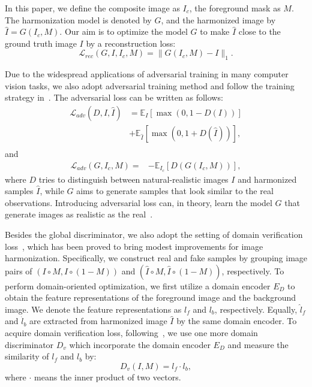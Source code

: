 \documentclass[final]{cvpr}
\begin{document}
In this paper, we define the composite image as $I_{c}$, the foreground mask as $M$. The harmonization model is denoted by $G$, and the harmonized image by $\hat{I} = G(I_{c}, M)$. Our aim is to optimize the model $G$ to make $\hat{I}$ close to the ground truth image $I$ by a reconstruction loss: 
\begin{equation}
\label{equ:rec}
\mathcal{L}_{rec}(G, I, I_{c}, M) = \|G(I_{c}, M) - I \|_{1}.
\end{equation}


Due to the widespread applications of adversarial training in many computer vision tasks, we also adopt adversarial training method and follow the training strategy in~\cite{cong2020dovenet,cun2020improving}. The adversarial loss can be written as follows:
\begin{equation}
\label{equ:adv_loss_d_hinge}
\begin{split}
\mathcal{L}_{adv}(D, I, \hat{I}) &= \mathbb{E}_{I}[\max(0, 1 - D(I))] \\
&+\mathbb{E}_{\hat{I}}[\max(0, 1+D(\hat{I}))], \\
\end{split}
\end{equation}
and
\begin{equation}
\label{equ:adv_loss_g_hinge}
\begin{split}
\mathcal{L}_{adv}(G, I_{c}, M) =& -\mathbb{E}_{I_{c}}[D(G(I_{c}, M))], 
\end{split}
\end{equation}
where $D$ tries to distinguish between natural-realistic images $I$ and harmonized samples $\hat{I}$, while $G$ aims to generate samples that look similar to the real observations. Introducing adversarial loss can, in theory, learn the model $G$ that generate images as realistic as the real~\cite{goodfellow2014generative,isola2017image}. 

Besides the global discriminator, we also adopt the setting of domain verification loss~\cite{cong2020dovenet}, which has been proved to bring modest improvements for image harmonization. Specifically, we construct real and fake samples by grouping image pairs of $(I\circ M, I\circ (1-M))$ and $(\hat{I}\circ M, \hat{I}\circ (1-M))$, respectively. To perform domain-oriented optimization, we first utilize a domain encoder $E_{D}$ to obtain the feature representations of the foreground image and the background image. We denote the feature representations as $l_{f}$ and $l_{b}$, respectively. Equally, $\hat{l}_{f}$ and $\hat{l}_{b}$ are extracted from harmonized image $\hat{I}$ by the same domain encoder. To acquire domain verification loss, following~\cite{cong2020dovenet}, we use one more domain discriminator $D_{v}$ which incorporate the domain encoder $E_{D}$ and measure the similarity of $l_{f}$ and $l_{b}$ by:
\begin{equation}
D_{v}(I, M)=l_{f}\cdot l_{b},
\end{equation}
where $\cdot$ means the inner product of two vectors.
\end{document}
